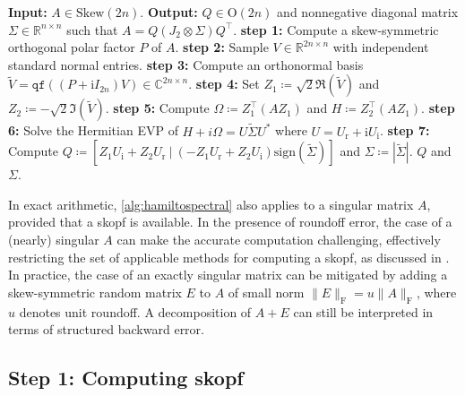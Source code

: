\documentclass[final,onefignum,onetabnum,dvipsnames]{siamart251216}
\numberwithin{algorithm}{section}
\numberwithin{equation}{section}
\begin{document}
\begin{algorithm}
    \caption{Real spectral decomposition (RSD) of skew-symmetric matrix}
    \begin{algorithmic}
        \STATE \textbf{Input:} $A\in\mathrm{Skew}(2n)$.
        \STATE \textbf{Output:} $Q\in\mathrm{O}(2n)$ and nonnegative diagonal matrix $\Sigma\in\mathbb{R}^{n\times n}$ such that $A = Q (J_2 \otimes \Sigma )Q^\top$.
        \STATE \textbf{step 1:} Compute a skew-symmetric orthogonal polar factor $P$ of $A$.
        \STATE \textbf{step 2:} Sample $V \in \mathbb R^{2n\times n}$ with independent standard normal entries.
        \STATE \textbf{step 3:} Compute an orthonormal basis $\widetilde{V} = \texttt{qf}((P + \mathrm{i}I_{2n})V)\in\mathbb{C}^{2n\times n}$.
        \STATE \textbf{step 4:} Set $Z_1 \coloneq \sqrt{2} \Re(\widetilde{V})$ and $Z_2 \coloneq -\sqrt{2} \Im(\widetilde{V})$.
        \STATE \textbf{step 5:} Compute $\Omega \coloneq  Z_1^\top (A Z_1)$ and $H\coloneq Z_2^\top (A Z_1) $.
        \STATE \textbf{step 6:} Solve the Hermitian EVP of $H + i\Omega = U\widetilde{\Sigma} U^*$ where $U = U_\mathrm{r} + \mathrm{i} U_\mathrm{i}$.
        \STATE \textbf{step 7:} Compute $Q \coloneq  [Z_1U_\mathrm{i} + Z_2U_\mathrm{r}\ |\ (-Z_1 U_\mathrm{r} + Z_2 U_\mathrm{i})\mathrm{sign}(\widetilde{\Sigma} )]$ and $\Sigma\coloneq |\widetilde{\Sigma} |$.
        \RETURN $Q$ and $\Sigma$.
    \end{algorithmic}
    \label{alg:hamiltospectral}
\end{algorithm}

\begin{remark}
   In exact arithmetic, \cref{alg:hamiltospectral}
   also applies to a singular matrix $A$, provided that a skopf is available. In the presence of roundoff error, the case of a (nearly) singular $A$ can make the accurate computation challenging, effectively restricting the set of applicable methods for computing a skopf, as discussed in . In practice, the case of an exactly singular matrix can be mitigated by adding a skew-symmetric random matrix $E$ to $A$ of small norm $\|E\|_\mathrm{F}  = u \|A\|_\mathrm{F}$, where $u$ denotes unit roundoff. A decomposition of $A+E$ can still be interpreted in terms of structured backward
error.
\end{remark}


\subsection{Step 1: Computing skopf}\label{sec:polar_factor}
\end{document}
